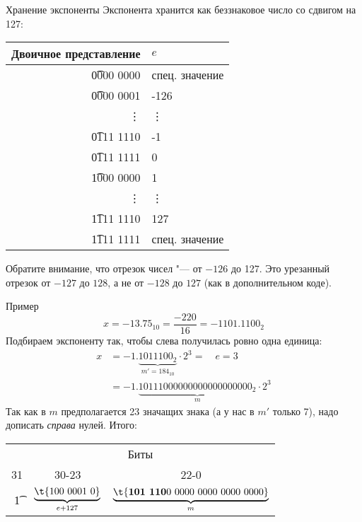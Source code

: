 \begin{frame}{Хранение экспоненты}
	Экспонента хранится как беззнаковое число со сдвигом на 127:
	\begin{center}
		\begin{tabular}{r|l}
			Двоичное представление & $e$ \\\hline
			\t{0000 0000} & спец. значение \\
			\t{0000 0001} & -126 \\
			\vdots & \vdots \\
			\t{0111 1110} & -1 \\
			\t{0111 1111} & 0 \\
			\t{1000 0000} & 1 \\
			\vdots & \vdots \\
			\t{1111 1110} & 127 \\
			\t{1111 1111} & спец. значение \\
		\end{tabular}
	\end{center}
	Обратите внимание, что отрезок чисел "--- от $-126$ до 127.
	Это урезанный отрезок от $-127$ до $128$, а не от $-128$ до $127$ (как в дополнительном коде).
\end{frame}

\begin{frame}{Пример}
	\[
		x = -13.75_{10} = \frac{-220}{16} = -1101.1100_2
	\]
	Подбираем экспоненту так, чтобы слева получилась ровно одна единица:
	\begin{align*}
		x &= -1.\underbrace{1011100_2}_{m'=184_{10}} \cdot 2^3 = \quad e=3 \\
		  &= -1.\underbrace{10111000000000000000000_2}_{m} \cdot 2^3
	\end{align*}
	Так как в $m$ предполагается 23 значащих знака (а у нас в $m'$ только 7), надо дописать \textit{справа} нулей.
	Итого:
	\begin{center}
		\begin{tabular}{c|c|c}
			\multicolumn{3}{c}{Биты} \\
			31 & 30-23 & 22-0 \\\hline
			\t{1} & $\underbrace{\t{100~0001~0}}_{e+127}$ & $\underbrace{\t{\textbf{101~110}0~0000~0000~0000~0000}}_{m}$ \\
		\end{tabular}
	\end{center}	
\end{frame}

